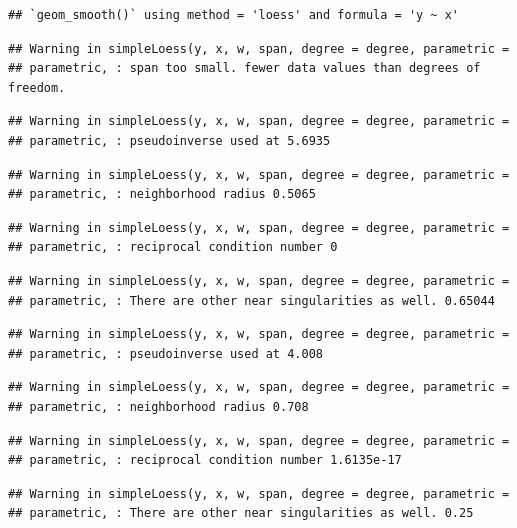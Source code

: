 \documentclass[
]{article}
\begin{document}
\begin{verbatim}
## `geom_smooth()` using method = 'loess' and formula = 'y ~ x'
\end{verbatim}

\begin{verbatim}
## Warning in simpleLoess(y, x, w, span, degree = degree, parametric =
## parametric, : span too small. fewer data values than degrees of freedom.
\end{verbatim}

\begin{verbatim}
## Warning in simpleLoess(y, x, w, span, degree = degree, parametric =
## parametric, : pseudoinverse used at 5.6935
\end{verbatim}

\begin{verbatim}
## Warning in simpleLoess(y, x, w, span, degree = degree, parametric =
## parametric, : neighborhood radius 0.5065
\end{verbatim}

\begin{verbatim}
## Warning in simpleLoess(y, x, w, span, degree = degree, parametric =
## parametric, : reciprocal condition number 0
\end{verbatim}

\begin{verbatim}
## Warning in simpleLoess(y, x, w, span, degree = degree, parametric =
## parametric, : There are other near singularities as well. 0.65044
\end{verbatim}

\begin{verbatim}
## Warning in simpleLoess(y, x, w, span, degree = degree, parametric =
## parametric, : pseudoinverse used at 4.008
\end{verbatim}

\begin{verbatim}
## Warning in simpleLoess(y, x, w, span, degree = degree, parametric =
## parametric, : neighborhood radius 0.708
\end{verbatim}

\begin{verbatim}
## Warning in simpleLoess(y, x, w, span, degree = degree, parametric =
## parametric, : reciprocal condition number 1.6135e-17
\end{verbatim}

\begin{verbatim}
## Warning in simpleLoess(y, x, w, span, degree = degree, parametric =
## parametric, : There are other near singularities as well. 0.25
\end{verbatim}
\end{document}
